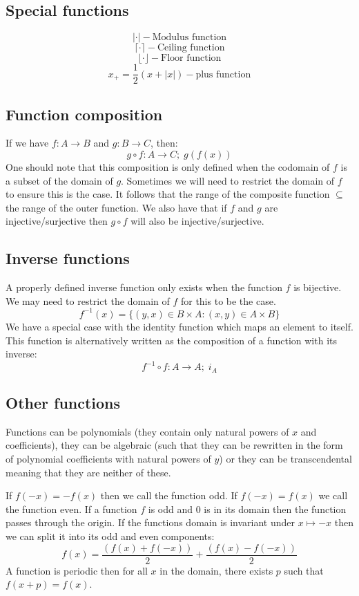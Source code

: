 \documentclass[12pt]{article}
\begin{document}
\subsection*{Special functions}
\[|\cdot|-\text{Modulus function}\]
\[\lceil\cdot\rceil-\text{Ceiling function}\]
\[\lfloor\cdot\rfloor-\text{Floor function}\]
\[x_+=\frac{1}{2}(x+|x|)-\text{plus function}\]
\subsection*{Function composition}
If we have \(f:A\to B\) and \(g:B\to C\), then:
\[g\circ f:A\to C;\;g(f(x))\]
One should note that this composition is only defined when the codomain of \(f\) is a subset of the domain of \(g\). Sometimes we will need to restrict the domain of \(f\) to ensure this is the case. It follows that the range of the composite function \(\subseteq\) the range of the outer function. We also have that if \(f\) and \(g\) are injective/surjective then \(g\circ f\) will also be injective/surjective.
\subsection*{Inverse functions}
A properly defined inverse function only exists when the function \(f\) is bijective. We may need to restrict the domain of \(f\) for this to be the case.
\[f^{-1}(x)=\{(y,x)\in B\times A: (x,y)\in A\times B\}\]
We have a special case with the identity function which maps an element to itself. This function is alternatively written as the composition of a function with its inverse:
\[f^{-1}\circ f:A\to A;\; i_A\]
\subsection*{Other functions}
Functions can be polynomials (they contain only natural powers of \(x\) and coefficients), they can be algebraic (such that they can be rewritten in the form of polynomial coefficients with natural powers of \(y\)) or they can be transcendental meaning that they are neither of these.

If \(f(-x)=-f(x)\) then we call the function odd. If \(f(-x)=f(x)\) we call the function even. If a function \(f\) is odd and 0 is in its domain then the function passes through the origin. If the functions domain is invariant under \(x\mapsto-x\) then we can split it into its odd and even components:
\[f(x)=\frac{(f(x)+f(-x))}{2}+\frac{(f(x)-f(-x))}{2}\]
A function is periodic then for all \(x\) in the domain, there exists \(p\) such that \(f(x+p)=f(x)\).
\end{document}
